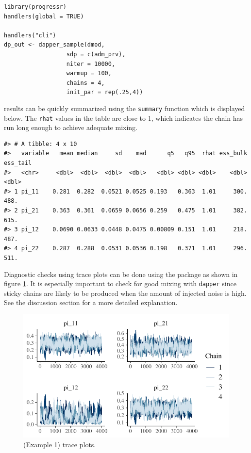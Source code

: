 \begin{verbatim}
library(progressr)
handlers(global = TRUE)

handlers("cli")
dp_out <- dapper_sample(dmod,
                  sdp = c(adm_prv),
                  niter = 10000,
                  warmup = 100,
                  chains = 4,
                  init_par = rep(.25,4))
\end{verbatim}

results can be quickly summarized using the \texttt{summary} function which is
displayed below. The \texttt{rhat} values in the table are close to 1, which indicates
the chain has run long enough to achieve adequate mixing.

\begin{verbatim}
#> # A tibble: 4 x 10
#>   variable   mean median     sd    mad      q5   q95  rhat ess_bulk ess_tail
#>   <chr>     <dbl>  <dbl>  <dbl>  <dbl>   <dbl> <dbl> <dbl>    <dbl>    <dbl>
#> 1 pi_11    0.281  0.282  0.0521 0.0525 0.193   0.363  1.01     300.     488.
#> 2 pi_21    0.363  0.361  0.0659 0.0656 0.259   0.475  1.01     382.     615.
#> 3 pi_12    0.0690 0.0633 0.0448 0.0475 0.00809 0.151  1.01     218.     487.
#> 4 pi_22    0.287  0.288  0.0531 0.0536 0.198   0.371  1.01     296.     511.
\end{verbatim}

Diagnostic checks using trace plots can be done using the  package
as shown in figure \ref{fig:trace-plot}. It is especially important to check for good mixing
with \texttt{dapper} since sticky chains are likely to be produced
when the amount of injected noise is high. See the discussion section
for a more detailed explanation.

\begin{figure}

{\centering \includegraphics{dppaper_files/figure-latex/trace-plot-1} 

}

\caption{(Example 1) trace plots.}\label{fig:trace-plot}
\end{figure}

